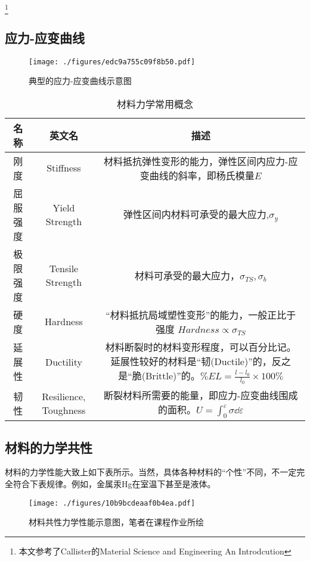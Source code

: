 
\begin{issues}
\issueDraft
\end{issues}
\footnote{本文参考了Callister的Material Science and Engineering An Introdcution}

\subsection{应力-应变曲线}

\begin{figure}[ht]
\centering
\texttt{[image: ./figures/edc9a755c09f8b50.pdf]}
\caption{典型的应力-应变曲线示意图} \label{fig_SSCUR_1}
\end{figure}

\begin{table}[ht]
\centering
\caption{材料力学常用概念}\label{tab_SSCUR_1}
\begin{tabular}{|c|c|c|}
\hline
名称 & 英文名 & 描述\\
\hline
刚度 & Stiffness & 材料抵抗弹性变形的能力，弹性区间内应力-应变曲线的斜率，即杨氏模量$E$\\
\hline
屈服强度 & Yield Strength & 弹性区间内材料可承受的最大应力,$\sigma_y$\\
\hline
极限强度 & Tensile Strength & 材料可承受的最大应力，$\sigma_{TS}, \sigma_b$\\
\hline
硬度 & Hardness & “材料抵抗局域塑性变形”的能力，一般正比于强度 $Hardness \propto \sigma_{TS}$\\
\hline
延展性 & Ductility & 材料断裂时的材料变形程度，可以百分比记。延展性较好的材料是“韧(Ductile)”的，反之是“脆(Brittle)”的。$\%EL = \frac{l-l_0}{l_0}\times 100\% $\\
\hline
韧性 & Resilience, Toughness & 断裂材料所需要的能量，即应力-应变曲线围成的面积。$U = \int_0^\varepsilon \sigma \dd \varepsilon$\\
\hline
\end{tabular}
\end{table}

\subsection{材料的力学共性}
材料的力学性能大致上如下表所示。当然，具体各种材料的“个性”不同，不一定完全符合下表规律。例如，金属汞Hg在室温下甚至是液体。

\begin{figure}[ht]
\centering
\texttt{[image: ./figures/10b9bcdeaaf0b4ea.pdf]}
\caption{材料共性力学性能示意图，笔者在课程作业所绘} \label{fig_SSCUR_2}
\end{figure}

